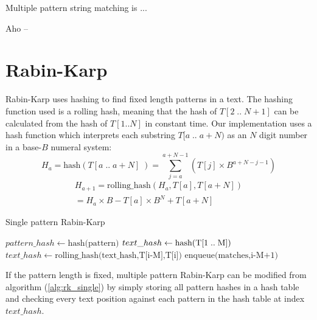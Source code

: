 \documentclass[final]{beamer}
\author{Aleksi Hartikainen and Jussi Kokkala}
\begin{document}
\begin{poster}

\newcolumn

Multiple pattern string matching is ...

Aho --

\section{Rabin-Karp}
      Rabin-Karp uses hashing to find fixed length patterns in a text. The hashing function used is a rolling hash, meaning that the hash of $T[2\;..\;N+1]$ can be calculated from the hash of $T[1..N]$ in constant time. Our implementation uses a hash function which interprets each substring $T[a\;..\;a+N)$ as an $N$ digit number in a base-$B$ numeral system:
\small
\begin{equation*}
H_a = \text{hash}(T[a\;..\;a+N]\;) = \sum_{j=a}^{a+N-1}(T[j] \times B^{a+N-j-1})
\end{equation*}
      \vspace{-4mm}
\begin{equation*}
\begin{multlined}
H_{a+1} = \text{rolling\_hash}(H_a, T[a], T[a+N])\\
= H_a \times B -  T[a] \times B^{N}  + T[a+N]
\end{multlined}
\end{equation*}
\normalsize
\vspace{10mm}
\begin{algorithm} [H]
\small
\caption{Single pattern Rabin-Karp}
\label{alg:rk_single}

\begin{algorithmic}[1]

\State $pattern\_hash \gets \text{hash(pattern)}$
\State $text\_hash \gets \text{hash(T[1\;..\;M])}$
        \State  $text\_hash \gets \text{rolling\_hash(text\_hash,T[i-M],T[i])}$
    \EndIf
            \State $\text{enqueue(matches,i-M+1)}$
        \EndIf
    \EndIf
\EndFor
\end{algorithmic}
\end{algorithm}

If the pattern length is fixed, multiple pattern Rabin-Karp can be modified from algorithm (\ref{alg:rk_single}) by simply storing all pattern hashes in a hash table and checking every text position against each pattern in the hash table at index $text\_hash$.


\end{poster}
\end{document}
